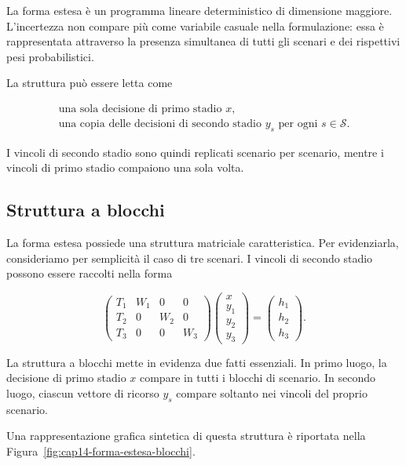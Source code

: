 La forma estesa \`e un programma lineare deterministico di dimensione
maggiore. L'incertezza non compare pi\`u come variabile casuale nella
formulazione: essa \`e rappresentata attraverso la presenza simultanea di
tutti gli scenari e dei rispettivi pesi probabilistici.

La struttura pu\`o essere letta come

\[
\begin{array}{c}
\text{una sola decisione di primo stadio }x,
\\[0.2cm]
\text{una copia delle decisioni di secondo stadio }y_s
\text{ per ogni }s\in\mathcal S.
\end{array}
\]

I vincoli di secondo stadio sono quindi replicati scenario per scenario,
mentre i vincoli di primo stadio compaiono una sola volta.

\subsection{Struttura a blocchi}

La forma estesa possiede una struttura matriciale caratteristica. Per
evidenziarla, consideriamo per semplicit\`a il caso di tre scenari.
I vincoli di secondo stadio possono essere raccolti nella forma

\[
\begin{pmatrix}
T_1 & W_1 & 0   & 0\\
T_2 & 0   & W_2 & 0\\
T_3 & 0   & 0   & W_3
\end{pmatrix}
\begin{pmatrix}
x\\
y_1\\
y_2\\
y_3
\end{pmatrix}
=
\begin{pmatrix}
h_1\\
h_2\\
h_3
\end{pmatrix}.
\]

La struttura a blocchi mette in evidenza due fatti essenziali. In primo
luogo, la decisione di primo stadio $x$ compare in tutti i blocchi di
scenario. In secondo luogo, ciascun vettore di ricorso $y_s$ compare
soltanto nei vincoli del proprio scenario.

Una rappresentazione grafica sintetica di questa struttura \`e riportata
nella Figura~\ref{fig:cap14-forma-estesa-blocchi}.

